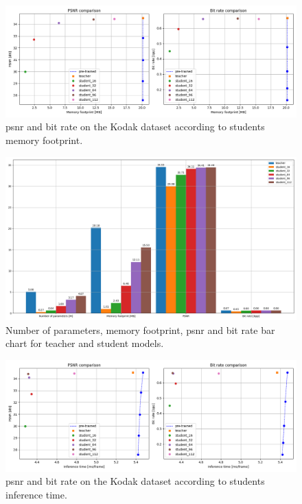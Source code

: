 \begin{figure}
    \centering
    \includegraphics[width=15cm]{img/kd_lic_memory.png}
    \caption[\acrshort{psnr} and bit rate on the Kodak dataset according to students memory footprint.]{\acrshort{psnr} and bit rate on the Kodak dataset according to students memory footprint.}
    \label{appendix:kd_lic_memory}
\end{figure}

\begin{figure}
    \centering
    \includegraphics[width=15cm]{img/kd_lic_bar_size.png}
    \caption[Number of parameters, memory footprint, \acrshort{psnr} and bit rate bar chart for teacher and student models.]{Number of parameters, memory footprint, \acrshort{psnr} and bit rate bar chart for teacher and student models.}
    \label{appendix:kd_lic_bar_size}
\end{figure}

\begin{figure}
    \centering
    \includegraphics[width=15cm]{img/kd_lic_time.png}
    \caption[\acrshort{psnr} and bit rate on the Kodak dataset according to students inference time.]{\acrshort{psnr} and bit rate on the Kodak dataset according to students inference time.}
    \label{appendix:kd_lic_time}
\end{figure}

